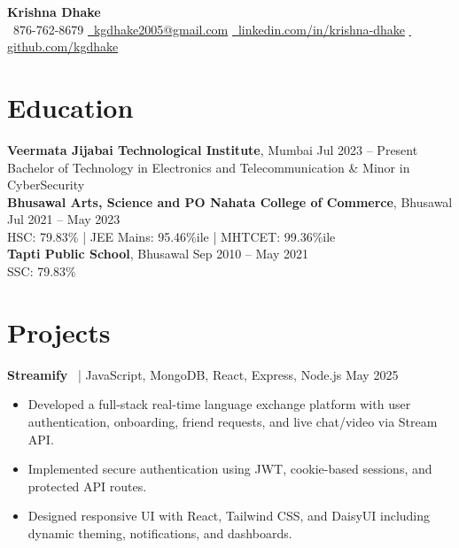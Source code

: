\documentclass[a4paper,11pt]{article}
\begin{document}
\begin{center}
    {\Huge \bfseries Krishna Dhake} \\ \vspace{6pt}
    \faPhone \, 876-762-8679 \quad 
    \href{mailto:kgdhake2005@gmail.com}{\faEnvelope \, kgdhake2005@gmail.com} \quad 
    \href{https://linkedin.com/in/krishna-dhake}{\faLinkedin \, linkedin.com/in/krishna-dhake} \quad  \href{https://github.com/kgdhake}{\faGithub \, github.com/kgdhake}
\end{center}





\section{Education}
\textbf{Veermata Jijabai Technological Institute}, Mumbai \hfill Jul 2023 -- Present \\
Bachelor of Technology in Electronics and Telecommunication \& Minor in CyberSecurity \\[4pt]

\textbf{Bhusawal Arts, Science and PO Nahata College of Commerce}, Bhusawal \hfill Jul 2021 -- May 2023 \\
HSC: 79.83\% \quad | \quad JEE Mains: 95.46\%ile \quad | \quad MHTCET: 99.36\%ile \\[4pt]

\textbf{Tapti Public School}, Bhusawal \hfill Sep 2010 -- May 2021 \\
SSC: 79.83\%



\section{Projects}
\textbf{Streamify} \, | JavaScript, MongoDB, React, Express, Node.js \hfill May 2025
\begin{itemize}[leftmargin=*]
  \item Developed a full-stack real-time language exchange platform with user authentication, onboarding, friend requests, and live chat/video via Stream API.
  \item Implemented secure authentication using JWT, cookie-based sessions, and protected API routes.
  \item Designed responsive UI with React, Tailwind CSS, and DaisyUI including dynamic theming, notifications, and dashboards.
\end{itemize}
\end{document}

